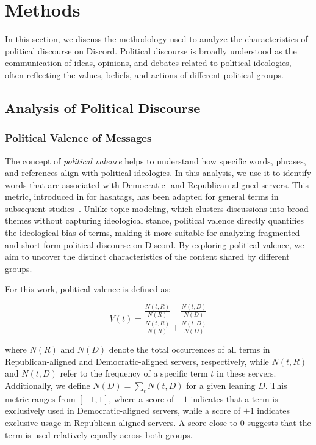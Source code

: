 \section{Methods}

In this section, we discuss the methodology used to analyze the characteristics of political discourse on Discord. Political discourse is broadly understood as the communication of ideas, opinions, and debates related to political ideologies, often reflecting the values, beliefs, and actions of different political groups.

\subsection{Analysis of Political Discourse}
\label{sec:txt}

\subsubsection{Political Valence of Messages}

The concept of \textit{political valence} helps to understand how specific words, phrases, and references align with political ideologies. In this analysis, we use it to identify words that are associated with Democratic- and Republican-aligned servers. This metric, introduced in \cite{conover2011political} for hashtags, has been adapted for general terms in subsequent studies~\cite{locatelli2022characterizing}. Unlike topic modeling, which clusters discussions into broad themes without capturing ideological stance, political valence directly quantifies the ideological bias of terms, making it more suitable for analyzing fragmented and short-form political discourse on Discord. By exploring political valence, we aim to uncover the distinct characteristics of the content shared by different groups.

For this work, political valence is defined as:

\[
V(t) = \frac{\frac{N(t, R)}{N(R)} - \frac{N(t, D)}{N(D)}}{\frac{N(t, R)}{N(R)} + \frac{N(t, D)}{N(D)}}
\]


\noindent
where \( N(R) \) and \( N(D) \) denote the total occurrences of all terms in Republican-aligned and Democratic-aligned servers, respectively, while \( N(t, R) \) and \( N(t, D) \) refer to the frequency of a specific term \( t \) in these servers. Additionally, we define \( N(D) = \sum_t N(t,D) \) for a given leaning \( D \). This metric ranges from \([-1, 1]\), where a score of \( -1 \) indicates that a term is exclusively used in Democratic-aligned servers, while a score of \( +1 \) indicates exclusive usage in Republican-aligned servers. A score close to \( 0 \) suggests that the term is used relatively equally across both groups.


